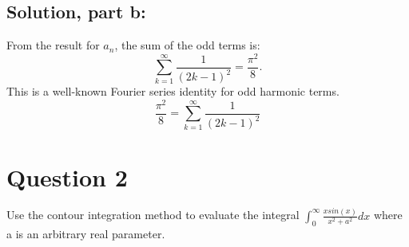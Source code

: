 \documentclass[12pt]{article}
\begin{document}
    \subsection*{Solution, part b:}
        From the result for \(a_n\), the sum of the odd terms is:
        \[
        \sum_{k=1}^\infty \frac{1}{(2k-1)^2} = \frac{\pi^2}{8}.
        \]
        This is a well-known Fourier series identity for odd harmonic terms.
        \[
        \boxed{\frac{\pi^2}{8} = \sum_{k=1}^\infty \frac{1}{(2k-1)^2}}
        \]

\section*{Question 2}
    Use the contour integration method to evaluate the integral $\int_0^\infty \frac{x sin(x)}{x^2 + a^2} dx$ where a is an arbitrary real parameter.
    
\end{document}

